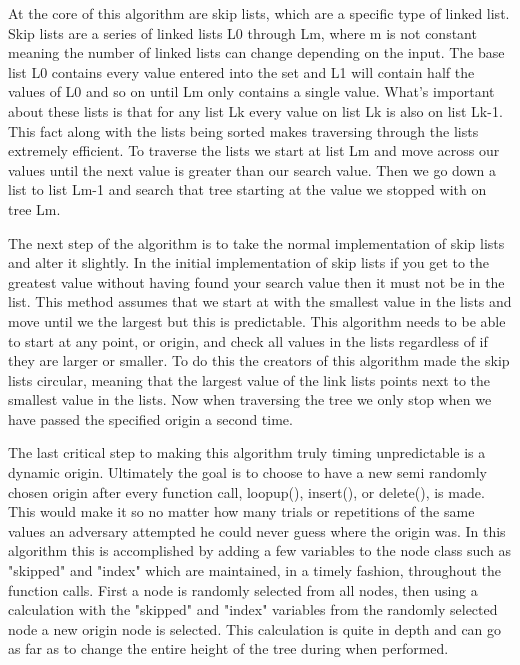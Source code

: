 \documentclass[10pt]{article}
\begin{document}
 At the core of this algorithm are skip lists, which are a specific type of linked list. 
Skip lists are a series of linked lists L0 through Lm, where m is not constant meaning
the number of linked lists can change depending on the input. The base list L0 contains
every value entered into the set and L1 will contain half the values of L0 and so on until 
Lm only contains a single value. What's important about these lists is that for any
list Lk every value on list Lk is also on list Lk-1. This fact along with the lists
being sorted makes traversing through the lists extremely efficient. To traverse the 
lists we start at list Lm and move across our values until the next value is greater 
than our search value. Then we go down a list to list Lm-1 and search that tree starting 
at the value we stopped with on tree Lm. 

	The next step of the algorithm is to take the normal implementation of skip 
lists and alter it slightly. In the initial implementation of skip lists if you
get to the greatest value without having found your search value then it must not 
be in the list. This method assumes that we start at with the smallest value in 
the lists and move until we the largest but this is predictable. This algorithm 
needs to be able to start at any point, or origin, and check all values in the 
lists regardless of if they are larger or smaller. To do this the creators of this 
algorithm made the skip lists circular, meaning that the largest value of the link 
lists points next to the smallest value in the lists. Now when traversing the tree 
we only stop when we have passed the specified origin a second time.
  
	The last critical step to making this algorithm truly timing unpredictable is a 
dynamic origin. Ultimately the goal is to choose to have a new semi randomly chosen 
origin after every function call, loopup(), insert(), or delete(), is made. This would 
make it so no matter how many trials or repetitions of the same values an adversary 
attempted he could never guess where the origin was. In this algorithm this is accomplished 
by adding a few variables to the node class such as "skipped" and "index" which are maintained, 
in a timely fashion, throughout the function calls. First a node is randomly selected from 
all nodes, then using a calculation with the "skipped" and "index" variables from the 
randomly selected node a new origin node is selected. This calculation is quite in depth 
and can go as far as to change the entire height of the tree during when performed.
\end{document}
